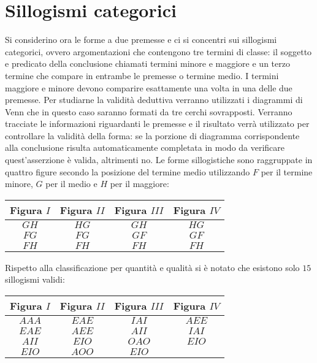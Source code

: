\section{Sillogismi categorici}
Si considerino ora le forme a due premesse e ci si concentri sui sillogismi categorici, ovvero argomentazioni che contengono tre termini di classe: il soggetto e predicato della conclusione chiamati termini 
minore e maggiore e un terzo termine che compare in entrambe le premesse o termine medio. I termini maggiore e minore devono comparire esattamente una volta in una delle due premesse. Per studiarne la 
validit\`a deduttiva verranno utilizzati i diagrammi di Venn che in questo caso saranno formati da tre cerchi sovrapposti. Verranno tracciate le informazioni riguardanti le premesse e il risultato verr\`a utilizzato 
per controllare la validit\`a della forma: se la porzione di diagramma corrispondente alla conclusione risulta automaticamente completata in modo da verificare quest'asserzione \`e valida, altrimenti no. Le 
forme sillogistiche sono raggruppate in quattro figure secondo la posizione del termine medio utilizzando $F$ per il termine minore, $G$ per il medio e $H$ per il maggiore:
\begin{center}
\begin{tabular}{|c|c|c|c|}
\hline
Figura $I$ & Figura $II$ & Figura $III$ & Figura $IV$\\
\hline
$GH$ &$HG$ &$GH$ & $HG$\\
$FG$  &$FG$& $GF$& $GF$\\
$FH$ & $FH$ & $FH$ & $FH$ \\
\hline
\end{tabular}
\end{center}
Rispetto alla classificazione per quantit\`a e qualit\`a si \`e notato che esistono solo $15$ sillogismi validi:
\begin{center}
\begin{tabular}{|c|c|c|c|}
\hline
Figura $I$ & Figura $II$ & Figura $III$ & Figura $IV$\\
\hline
$AAA$ &$EAE$ &$IAI$ & $AEE$\\
$EAE$  &$AEE$& $AII$& $IAI$\\
$AII$ & $EIO$ & $OAO$ & $EIO$ \\
$EIO$ & $AOO$ & $EIO$ &\\
\hline
\end{tabular}
\end{center}
